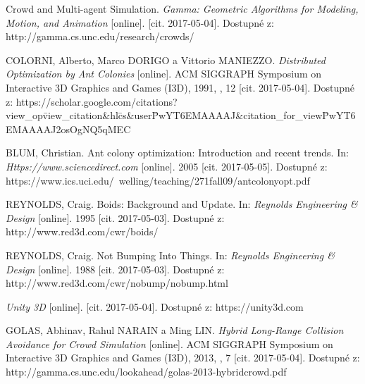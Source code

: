 \begin{thebibliography}{99}

Crowd and Multi-agent Simulation. \textit{Gamma: Geometric Algorithms for Modeling, Motion, and Animation} [online]. [cit. 2017-05-04]. Dostupné z: http://gamma.cs.unc.edu/research/crowds/

COLORNI, Alberto, Marco DORIGO a Vittorio MANIEZZO. \textit{Distributed Optimization by Ant Colonies} [online]. ACM SIGGRAPH Symposium on Interactive 3D Graphics and Games (I3D), 1991, , 12 [cit. 2017-05-04]. Dostupné z: https://scholar.google.com/citations?view\_op\=view\_citation\&hl\=cs\&user\=PwYT6EMAAAAJ\&citation\_for\_view\=PwYT6EMAAAAJ\:2osOgNQ5qMEC

BLUM, Christian. Ant colony optimization: Introduction and recent trends. In: \textit{Https://www.sciencedirect.com} [online]. 2005 [cit. 2017-05-05]. Dostupné z: https://www.ics.uci.edu/~welling/teaching/271fall09/antcolonyopt.pdf

REYNOLDS, Craig. Boids: Background and Update. In: \textit{Reynolds Engineering \& Design} [online]. 1995 [cit. 2017-05-03]. Dostupné z: http://www.red3d.com/cwr/boids/

REYNOLDS, Craig. Not Bumping Into Things. In: \textit{Reynolds Engineering \& Design} [online]. 1988 [cit. 2017-05-03]. Dostupné z: http://www.red3d.com/cwr/nobump/nobump.html

\textit{Unity 3D} [online]. [cit. 2017-05-04]. Dostupné z: https://unity3d.com

GOLAS, Abhinav, Rahul NARAIN a Ming LIN. \textit{Hybrid Long-Range Collision Avoidance for Crowd Simulation} [online]. ACM SIGGRAPH Symposium on Interactive 3D Graphics and Games (I3D), 2013, , 7 [cit. 2017-05-04]. Dostupné z: http://gamma.cs.unc.edu/lookahead/golas-2013-hybridcrowd.pdf

\end{thebibliography}